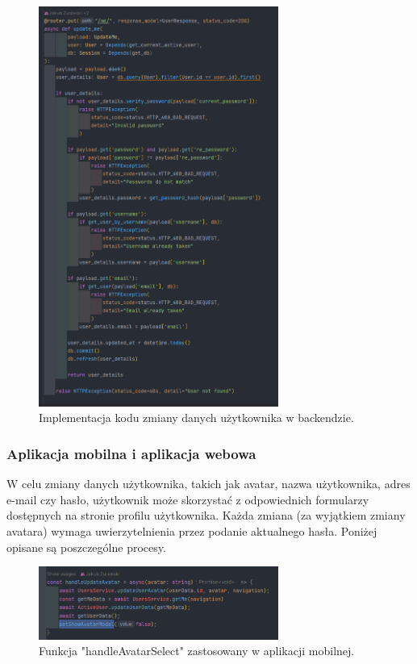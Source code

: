 \begin{figure}[H]
    \centering
    \includegraphics[width=0.7\textwidth]{chapters/chapter_8/screens/edit_user_backend_2}
    \caption{Implementacja kodu zmiany danych użytkownika w backendzie.}
    \label{img:edit_user_backend_2}
\end{figure}

\subsubsection{Aplikacja mobilna i aplikacja webowa}
W celu zmiany danych użytkownika, takich jak avatar, nazwa użytkownika, adres e-mail czy hasło, użytkownik może skorzystać z odpowiednich formularzy dostępnych na stronie profilu użytkownika. Każda zmiana (za wyjątkiem zmiany avatara) wymaga uwierzytelnienia przez podanie aktualnego hasła. Poniżej opisane są poszczególne procesy.

\begin{figure}[H]
    \centering
    \includegraphics[width=0.7\textwidth]{chapters/chapter_8/screens/edit_user_mobile}
    \caption{Funkcja "handleAvatarSelect" zastosowany w aplikacji mobilnej.}
    \label{img:edit_user_mobile}
\end{figure}

